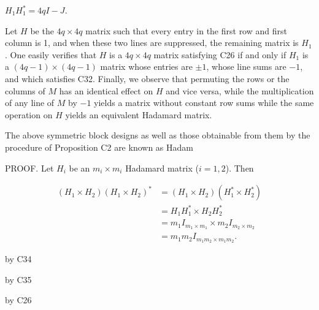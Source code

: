 $H_1H_1^* = 4qI - J$.

Let $H$ be the $4q \times 4q$ matrix such that every entry in the first row and first column is 1, and when these two lines are suppressed, the remaining matrix is $H_1$. One easily verifies that $H$ is a $4q \times 4q$ matrix satisfying C26 if and only if $H_1$ is a $(4q - 1) \times (4q - 1)$ matrix whose entries are $\pm 1$, whose line sums are $-1$, and which satisfies C32. Finally, we observe that permuting the rows or the columns of $M$ has an identical effect on $H$ and vice versa, while the multiplication of any line of $M$ by $-1$ yields a matrix without constant row sums while the same operation on $H$ yields an equivalent Hadamard matrix.

The above symmetric block designs as well as those obtainable from them by the procedure of Proposition C2 are known as Hadam

PROOF. Let $H_i$ be an $m_i \times m_i$ Hadamard matrix ($i = 1, 2$). Then

$$\begin{align*}
(H_1 \times H_2)(H_1 \times H_2)^* &= (H_1 \times H_2)(H_1^* \times H_2^*) \\
&= H_1 H_1^* \times H_2 H_2^* \\
&= m_1 I_{m_1 \times m_1} \times m_2 I_{m_2 \times m_2} \\
&= m_1 m_2 I_{m_1 m_2 \times m_1 m_2}.
\end{align*}$$

by C34

by C35

by C26
